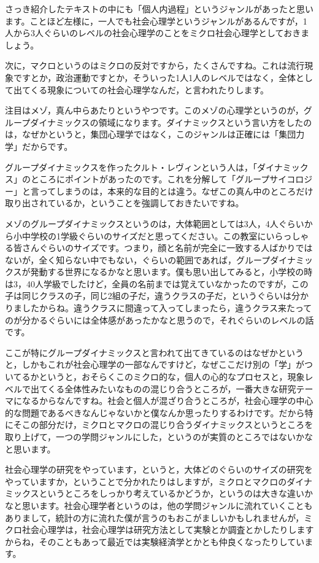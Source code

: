 \documentclass{ltjsbook}
\begin{document}
さっき紹介したテキスト\parencite{SPgairon2016,}の中にも「個人内過程」というジャンルがあったと思います。ことほど左様に，一人でも社会心理学というジャンルがあるんですが，1人から3人ぐらいのレベルの社会心理学のことをミクロ社会心理学としておきましょう。

次に，マクロというのはミクロの反対ですから，たくさんですね。これは流行現象ですとか，政治運動ですとか，そういった1人1人のレベルではなく，全体として出てくる現象についての社会心理学なんだ，と言われたりします。

注目はメゾ，真ん中らあたりというやつです。このメゾの心理学というのが，グループダイナミックスの領域になります。ダイナミックスという言い方をしたのは，なぜかというと，集団心理学ではなく，このジャンルは正確には「集団力学」だからです。

グループダイナミックスを作ったクルト・レヴィンという人は，「ダイナミックス」のところにポイントがあったのです。これを分解して「グループサイコロジー」と言ってしまうのは，本来的な目的とは違う。なぜこの真ん中のところだけ取り出されているか，ということを強調しておきたいですね。

メゾのグループダイナミックスというのは，大体範囲としては3人，4人ぐらいから小中学校の1学級ぐらいのサイズだと思ってください。この教室にいらっしゃる皆さんぐらいのサイズです。つまり，顔と名前が完全に一致する人ばかりではないが，全く知らない中でもない，ぐらいの範囲であれば，グループダイナミックスが発動する世界になるかなと思います。僕も思い出してみると，小学校の時は3，40人学級でしたけど，全員の名前までは覚えていなかったのですが，この子は同じクラスの子，同じ2組の子だ，違うクラスの子だ，というぐらいは分かりましたからね。違うクラスに間違って入ってしまったら，違うクラス来たってのが分かるぐらいには全体感があったかなと思うので，それぐらいのレベルの話です。

ここが特にグループダイナミックスと言われて出てきているのはなぜかというと，しかもこれが社会心理学の一部なんですけど，なぜここだけ別の「学」がついてるかというと，おそらくこのミクロ的な，個人の心的なプロセスと，現象レベルで出てくる全体性みたいなものの混じり合うところが，一番大きな研究テーマになるからなんですね。社会と個人が混ざり合うところが，社会心理学の中心的な問題であるべきなんじゃないかと僕なんか思ったりするわけです。だから特にそこの部分だけ，ミクロとマクロの混じり合うダイナミックスというところを取り上げて，一つの学問ジャンルにした，というのが実質のところではないかなと思います。

社会心理学の研究をやっています，というと，大体どのぐらいのサイズの研究をやっていますか，ということで分かれたりはしますが，ミクロとマクロのダイナミックスというところをしっかり考えているかどうか，というのは大きな違いかなと思います。社会心理学者というのは，他の学問ジャンルに流れていくこともありまして，統計の方に流れた僕が言うのもおこがましいかもしれませんが，ミクロ社会心理学は，社会心理学は研究方法として実験とか調査とかしたりしますからね，そのこともあって最近では実験経済学とかとも仲良くなったりしています。
\end{document}
